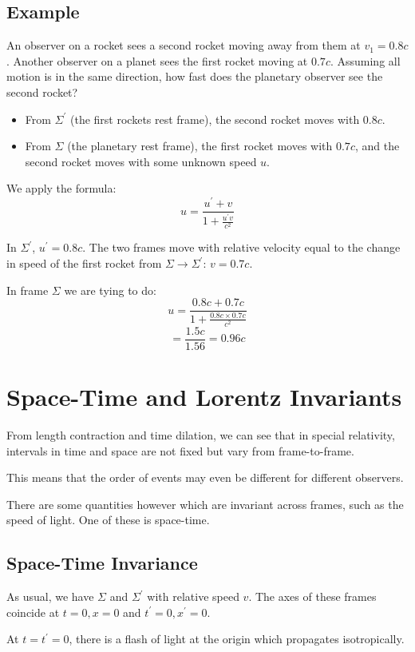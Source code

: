 \subsection{Example}
An observer on a rocket sees a second rocket moving away from them at $v_1 = 0.8c$. Another observer on a planet sees the first rocket moving at $0.7c$. Assuming all motion is in the same direction, how fast does the planetary observer see the second rocket?

\begin{itemize}
    \item From $\Sigma^\prime$ (the first rockets rest frame), the second rocket moves with $0.8c$.
    \item From $\Sigma$ (the planetary rest frame), the first rocket moves with $0.7c$, and the second rocket moves with some unknown speed $u$.
\end{itemize}

We apply the formula:
\[
    u = \frac{u^\prime + v}{1 + \frac{u^\prime v}{c^2}}
\]

In $\Sigma^\prime$, $u^\prime = 0.8c$. The two frames move with relative velocity equal to the change in speed of the first rocket from $\Sigma \to \Sigma^\prime$: $v = 0.7c$.

In frame $\Sigma$ we are tying to do:
\[
    u = \frac{0.8c + 0.7c}{1 + \frac{0.8c \times 0.7c}{c^2}}
\]
\[
    = \frac{1.5c}{1.56} = 0.96c
\]

\section{Space-Time and Lorentz Invariants}
From length contraction and time dilation, we can see that in special relativity, intervals in time and space are not fixed but vary from frame-to-frame.

This means that the order of events may even be different for different observers. 

There are some quantities however which are invariant across frames, such as the speed of light. One of these is space-time.

\subsection{Space-Time Invariance}
As usual, we have $\Sigma$ and $\Sigma^\prime$ with relative speed $v$. The axes of these frames coincide at $t = 0, x =0$ and $t^\prime = 0, x^\prime = 0$.

At $t=t^\prime=0$, there is a flash of light at the origin which propagates isotropically.

